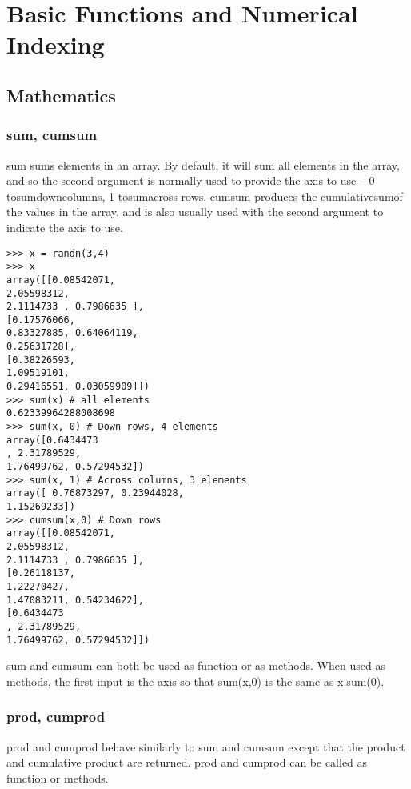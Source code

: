 \section{Basic Functions and Numerical Indexing}
\subsection{Mathematics}
\subsubsection*{sum, cumsum}
sum sums elements in an array. By default, it will sum all elements in the array, and so the second argument
is normally used to provide the axis to use – 0 tosumdowncolumns, 1 tosumacross rows. cumsum produces
the cumulativesumof the values in the array, and is also usually used with the second argument to indicate
the axis to use.
\begin{framed}
\begin{verbatim}
>>> x = randn(3,4)
>>> x
array([[0.08542071,
2.05598312,
2.1114733 , 0.7986635 ],
[0.17576066,
0.83327885, 0.64064119,
0.25631728],
[0.38226593,
1.09519101,
0.29416551, 0.03059909]])
>>> sum(x) # all elements
0.62339964288008698
>>> sum(x, 0) # Down rows, 4 elements
array([0.6434473
, 2.31789529,
1.76499762, 0.57294532])
>>> sum(x, 1) # Across columns, 3 elements
array([ 0.76873297, 0.23944028,
1.15269233])
>>> cumsum(x,0) # Down rows
array([[0.08542071,
2.05598312,
2.1114733 , 0.7986635 ],
[0.26118137,
1.22270427,
1.47083211, 0.54234622],
[0.6434473
, 2.31789529,
1.76499762, 0.57294532]])
\end{verbatim}
\end{framed}
sum and cumsum can both be used as function or as methods. When used as methods, the first input is the
axis so that sum(x,0) is the same as x.sum(0).
\subsubsection*{prod, cumprod}
prod and cumprod behave similarly to sum and cumsum except that the product and cumulative product are
returned. prod and cumprod can be called as function or methods.

